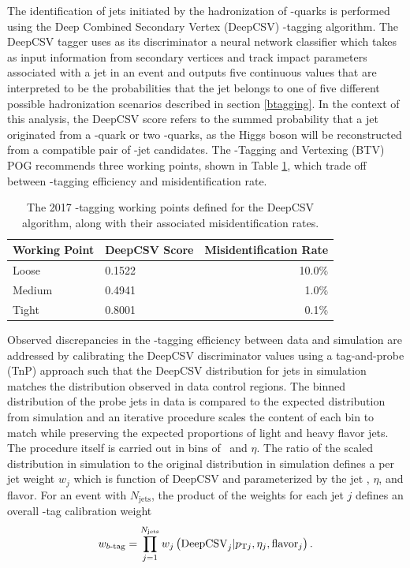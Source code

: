 The identification of jets initiated by the hadronization of \qrkb-quarks is performed using the Deep Combined Secondary Vertex (DeepCSV)\cite{CMSBTAG} \qrkb-tagging algorithm. The DeepCSV tagger uses as its discriminator a neural network classifier which takes as input information from secondary vertices and track impact parameters associated with a jet in an event and outputs five continuous values that are interpreted to be the probabilities that the jet belongs to one of five different possible hadronization scenarios described in section \ref{btagging}. In the context of this analysis, the DeepCSV score refers to the summed probability that a jet originated from a \qrkb-quark or two \qrkb-quarks, as the Higgs boson will be reconstructed from a compatible pair of \qrkb-jet candidates. The \qrkb-Tagging and Vertexing (BTV) POG recommends three working points, shown in Table \ref{tbl:deepcsvwp}, which trade off between \qrkb-tagging efficiency and misidentification rate.

\begin{table}[htbp]
  \caption[2017 DeepCSV Working Points]{The 2017 \qrkb-tagging working points defined for the DeepCSV algorithm, along with their associated misidentification rates.\cite{CMSBTAG}}
  \label{tbl:deepcsvwp}
  \begin{tabularx}{6.5in}{XXr}
    \hline
    Working Point & DeepCSV Score & Misidentification Rate \\
    \hline
    Loose         & 0.1522        & 10.0\%                 \\
    Medium        & 0.4941        & 1.0\%                  \\
    Tight         & 0.8001        & 0.1\%                  \\
    \hline
  \end{tabularx}
\end{table}

Observed discrepancies in the \qrkb-tagging efficiency between data and simulation are addressed by calibrating the DeepCSV discriminator values using a tag-and-probe (TnP) approach such that the DeepCSV distribution for jets in simulation matches the distribution observed in data control regions. The binned distribution of the probe jets in data is compared to the expected distribution from simulation and an iterative procedure scales the content of each bin to match while preserving the expected proportions of light and heavy flavor jets. The procedure itself is carried out in bins of \pT\ and $\eta$. The ratio of the scaled distribution in simulation to the original distribution in simulation defines a per jet weight $w_{j}$ which is function of DeepCSV and parameterized by the jet \pT, $\eta$, and flavor. For an event with $N_{\mathrm{jets}}$, the product of the weights for each jet $j$ defines an overall \qrkb-tag calibration weight
\begin{equation}
  w_{\qrkb\text{-}\mathrm{tag}} = \prod_{j=1}^{N_{\mathrm{jets}}} w_{j} \left( \mathrm{DeepCSV}_{j} | p_{\mathrm{T}j}, \eta_{j}, \mathrm{flavor}_{j} \right).
  \label{eq:btagweight}
\end{equation}

